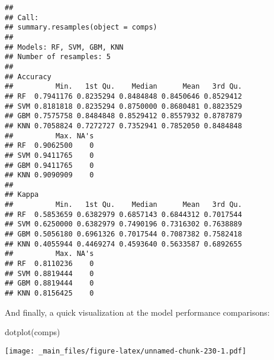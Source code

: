 \documentclass[
]{book}
\newenvironment{Shaded}{\begin{snugshade}}{\end{snugshade}}
\newcommand{\FunctionTok}[1]{\textcolor[rgb]{0.00,0.00,0.00}{#1}}
\newcommand{\NormalTok}[1]{#1}
\begin{document}
\begin{verbatim}
## 
## Call:
## summary.resamples(object = comps)
## 
## Models: RF, SVM, GBM, KNN 
## Number of resamples: 5 
## 
## Accuracy 
##          Min.   1st Qu.    Median      Mean   3rd Qu.
## RF  0.7941176 0.8235294 0.8484848 0.8450646 0.8529412
## SVM 0.8181818 0.8235294 0.8750000 0.8680481 0.8823529
## GBM 0.7575758 0.8484848 0.8529412 0.8557932 0.8787879
## KNN 0.7058824 0.7272727 0.7352941 0.7852050 0.8484848
##          Max. NA's
## RF  0.9062500    0
## SVM 0.9411765    0
## GBM 0.9411765    0
## KNN 0.9090909    0
## 
## Kappa 
##          Min.   1st Qu.    Median      Mean   3rd Qu.
## RF  0.5853659 0.6382979 0.6857143 0.6844312 0.7017544
## SVM 0.6250000 0.6382979 0.7490196 0.7316302 0.7638889
## GBM 0.5056180 0.6961326 0.7017544 0.7087382 0.7582418
## KNN 0.4055944 0.4469274 0.4593640 0.5633587 0.6892655
##          Max. NA's
## RF  0.8110236    0
## SVM 0.8819444    0
## GBM 0.8819444    0
## KNN 0.8156425    0
\end{verbatim}

And finally, a quick visualization at the model performance comparisons:

\begin{Shaded}
\begin{Highlighting}[]
\FunctionTok{dotplot}\NormalTok{(comps)}
\end{Highlighting}
\end{Shaded}

\texttt{[image: \_main\_files/figure-latex/unnamed-chunk-230-1.pdf]}
\end{document}
